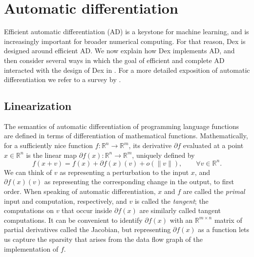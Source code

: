 \documentclass[acmsmall,screen,nonacm]{acmart}
\newcommand{\R}{\mathbb{R}}
\begin{document}
\section{Automatic differentiation}
\label{sec:ad}

Efficient automatic differentiation (AD) is a keystone for machine learning, and is increasingly important for broader numerical computing.
For that reason, Dex is designed around efficient AD.
We now explain how Dex implements AD, and then consider several ways in which the goal of efficient and complete AD interacted with the design of Dex in .
For a more detailed exposition of automatic differentiation we refer to a survey by \citet{baydin2017adsurvey}.

\subsection{Linearization}
\label{sec:linearization}

The semantics of automatic differentiation of programming language functions are defined in terms of differentiation of mathematical functions.
Mathematically, for a sufficiently nice function $f: \R^n \to \R^m$, its derivative $\partial f$ evaluated at a point $x \in \R^n$ is the linear map $\partial f(x): \R^n \to \R^m$, uniquely defined by
\[
    f(x + v) = f(x) + \partial f(x)(v) + o(\|v\|), \qquad \forall v \in \R^n.
\]
We can think of $v$ as representing a perturbation to the input $x$, and $\partial f(x)(v)$ as representing the corresponding change in the output, to first order.
When speaking of automatic differentiation, $x$ and $f$ are called the \emph{primal} input and computation,  respectively, and $v$ is called the \emph{tangent}; the computations on $v$ that occur inside $\partial f(x)$ are similarly called tangent computations.
It can be convenient to identify $\partial f(x)$ with an $\R^{m \times n}$ matrix of partial derivatives called the Jacobian,
but representing $\partial f(x)$ as a function lets us capture the sparsity that arises from the data flow graph of the implementation of $f$.
\end{document}
